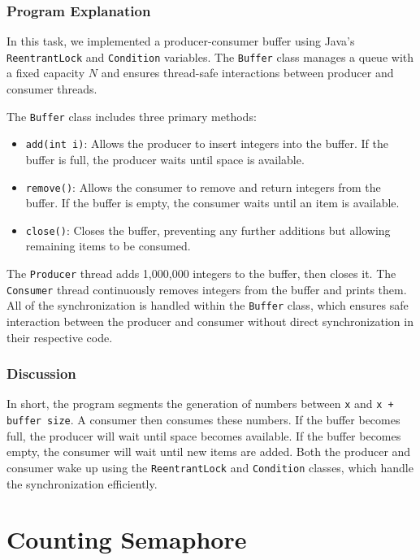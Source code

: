 \documentclass{article}
\begin{document}
\subsubsection{Program Explanation}
In this task, we implemented a producer-consumer buffer using Java's \\ \texttt{ReentrantLock} and \texttt{Condition} variables. The \texttt{Buffer} class manages a queue with a fixed capacity \(N\) and ensures thread-safe interactions between producer and consumer threads.

The \texttt{Buffer} class includes three primary methods:
\begin{itemize}
    \item \texttt{add(int i)}: Allows the producer to insert integers into the buffer. If the buffer is full, the producer waits until space is available.
    \item \texttt{remove()}: Allows the consumer to remove and return integers from the buffer. If the buffer is empty, the consumer waits until an item is available.
    \item \texttt{close()}: Closes the buffer, preventing any further additions but allowing remaining items to be consumed.
\end{itemize}

The \texttt{Producer} thread adds 1,000,000 integers to the buffer, then closes it. The \texttt{Consumer} thread continuously removes integers from the buffer and prints them. All of the synchronization is handled within the \texttt{Buffer} class, which ensures safe interaction between the producer and consumer without direct synchronization in their respective code.


\subsubsection{Discussion}
In short, the program segments the generation of numbers between \texttt{x} and \texttt{x + buffer size}. A consumer then consumes these numbers. If the buffer becomes full, the producer will wait until space becomes available. If the buffer becomes empty, the consumer will wait until new items are added. Both the producer and consumer wake up using the \texttt{ReentrantLock} and \texttt{Condition} classes, which handle the synchronization efficiently.



\newpage
\section{Counting Semaphore}
\end{document}
